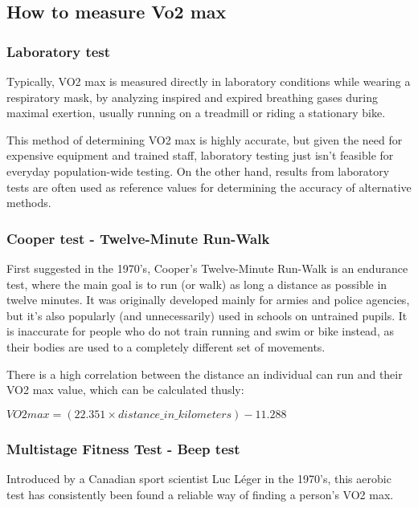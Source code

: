 \subsection{How to measure Vo2 max}

\subsubsection*{Laboratory test}

Typically, VO2 max is measured directly in laboratory conditions while wearing a respiratory mask, by analyzing inspired and expired breathing gases during maximal exertion,\cite{vo2max-definition} usually running on a treadmill or riding a stationary bike.

This method of determining VO2 max is highly accurate, but given the need for expensive equipment and trained staff, laboratory testing just isn't feasible for everyday population-wide testing.
On the other hand, results from laboratory tests are often used as reference values for determining the accuracy of alternative methods.

\subsubsection*{Cooper test - Twelve-Minute Run-Walk}

First suggested in the 1970's, Cooper's Twelve-Minute Run-Walk is an endurance test, where the main goal is to run (or walk) as long a distance as possible in twelve minutes.
It was originally developed mainly for armies and police agencies, but it's also popularly (and unnecessarily\cite{cooper-pupils}) used in schools on untrained pupils.
It is inaccurate for people who do not train running and swim or bike instead, as their bodies are used to a completely different set of movements.

There is a high correlation between the distance an individual can run and their VO2 max value, which can be calculated thusly:

$VO2max = (22.351 \times distance\_in\_kilometers) - 11.288$\cite{cooper-vo2max}

\subsubsection*{Multistage Fitness Test - Beep test}

Introduced by a Canadian sport scientist Luc Léger in the 1970's, this aerobic test has consistently been found a reliable way of finding a person's VO2 max.

